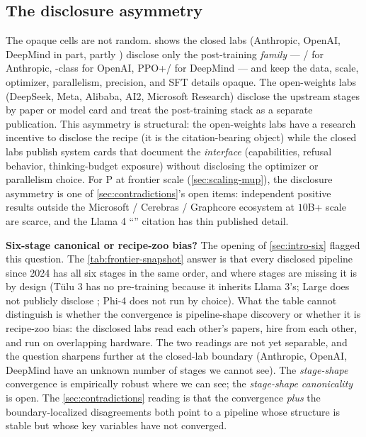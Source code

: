 \subsection{The disclosure asymmetry}
\label{sec:snap-opaque}

The opaque cells are not random.  shows
the closed labs (Anthropic, OpenAI, DeepMind in part, partly )
disclose only the post-training \emph{family} ---  /  for
Anthropic, -class for OpenAI, PPO+/ for DeepMind --- and
keep the data, scale, optimizer, parallelism, precision, and SFT
details opaque. The open-weights labs (DeepSeek, Meta, Alibaba, AI2,
Microsoft Research) disclose the upstream stages by paper or model
card and treat the post-training stack as a separate publication.
This asymmetry is structural: the open-weights labs have a research
incentive to disclose the recipe (it is the citation-bearing object)
while the closed labs publish system cards that document the
\emph{interface} (capabilities, refusal behavior, thinking-budget
exposure) without disclosing the optimizer or parallelism choice.
For \textmu P at frontier scale (\cref{sec:scaling-mup}), the
disclosure asymmetry is one of \cref{sec:contradictions}'s open
items: independent positive results outside the
Microsoft / Cerebras / Graphcore ecosystem at $10$B+ scale are
scarce, and the Llama 4 \citep{meta-llama4} ``'' citation has
thin published detail.

\begin{contradiction}
\textbf{Six-stage canonical or recipe-zoo bias?} The opening of
\cref{sec:intro-six} flagged this question. The
\cref{tab:frontier-snapshot} answer is that every disclosed pipeline
since 2024 has all six stages in the same order, and where stages
are missing it is by design (Tülu 3 has no pre-training because it
inherits Llama 3's;  Large does not publicly disclose
; Phi-4 does not run  by choice). What the table cannot
distinguish is whether the convergence is pipeline-shape
discovery or whether it is recipe-zoo bias: the disclosed labs
read each other's papers, hire from each other, and run on overlapping
hardware. The two readings are not yet separable, and the question
sharpens further at the closed-lab boundary (Anthropic, OpenAI,
DeepMind have an unknown number of stages we cannot see). The
\emph{stage-shape} convergence is empirically robust where we can
see; the \emph{stage-shape canonicality} is open. The
\cref{sec:contradictions} reading is that the convergence
\emph{plus} the boundary-localized disagreements both point to a
pipeline whose structure is stable but whose key variables
have not converged.
\end{contradiction}

